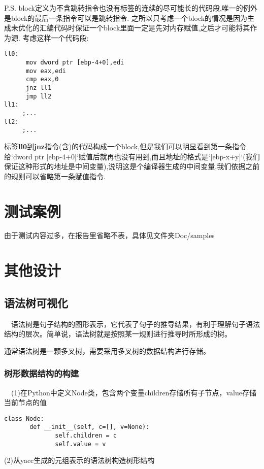 \documentclass{article}
\begin{document}
P.S. block定义为不含跳转指令也没有标签的连续的尽可能长的代码段,唯一的例外是block的最后一条指令可以是跳转指令.
之所以只考虑一个block的情况是因为生成未优化的汇编代码时保证一个block里面一定是先对内存赋值,之后才可能将其作为源.
考虑这样一个代码段:

\begin{verbatim}
ll0:
      mov dword ptr [ebp-4+0],edi
      mov eax,edi
      cmp eax,0
      jnz ll1
      jmp ll2
ll1:
     ;...
ll2:
     ;...
\end{verbatim}

标签\textbf{ll0}到\textbf{jnz}指令(含)的代码构成一个block,但是我们可以明显看到第一条指令给`dword ptr [ebp-4+0]`赋值后就再也没有用到,而且地址的格式是`[ebp-x+y]`(我们保证这种形式的地址是中间变量),说明这是个编译器生成的中间变量,我们依据之前的规则可以省略第一条赋值指令.



\section{测试案例}

由于测试内容过多，在报告里省略不表，具体见文件夹Doc/samples

\section{其他设计}

\subsection{语法树可视化}
\quad \ \ 语法树是句子结构的图形表示，它代表了句子的推导结果，有利于理解句子语法结构的层次。简单说，语法树就是按照某一规则进行推导时所形成的树。


通常语法树是一颗多叉树，需要采用多叉树的数据结构进行存储。

\subsubsection{树形数据结构的构建}

\quad \ \ (1)在Python中定义Node类，包含两个变量children存储所有子节点，value存储当前节点的值

\begin{verbatim}
class Node:
       def __init__(self, c=[], v=None):
              self.children = c
              self.value = v
\end{verbatim}

(2)从yacc生成的元组表示的语法树构造树形结构
\end{document}
